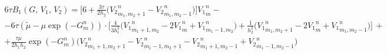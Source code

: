 \begin{multline*}
6\tau B_1 (G, \, V_1, \, V_2) =
\bigg[ 6 + \frac{3 \tau}{2 h_2} \bigg( {V_2}^{n}_{m_1, m_2 + 1} - {V_2}^{n}_{m_1, m_2 - 1} \bigg) \bigg] {V_1}^{n}_{m} 
- \\ -
6\tau (\widetilde{\mu} - \mu \exp(-G^n_m)) \cdot \bigg[ 
	\frac{4}{3 h_1^2} \bigg( {V_1}^n_{m_1 + 1, m_2} - 2 {V_1}^{n}_{m}  + {V_1}^n_{m_1 - 1, m_2} \bigg) +
	\frac{1}{  h_2^2} \bigg( {V_1}^n_{m_1, m_2 + 1} - 2 {V_1}^{n}_{m}  + {V_1}^n_{m_1, m_2 - 1} \bigg)  \bigg]
\, + \\ +
\frac{\tau \mu}{2 h_1 h_2} \exp(-G^n_m)
	\bigg( {V_2}^n_{m_1 + 1, m_2 + 1} - {V_2}^n_{m_1 - 1, m_2 + 1} - {V_2}^n_{m_1 + 1, m_2 - 1} + {V_2}^n_{m_1 - 1, m_2 - 1} \bigg)
\end{multline*}
